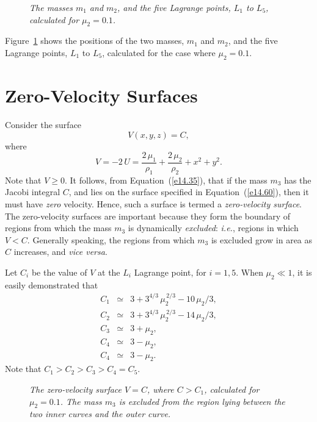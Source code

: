 \begin{figure}
\epsfysize=2.75in
\centerline{}
\caption{\em The masses $m_1$ and $m_2$, and the five Lagrange points, $L_1$ to $L_5$, calculated
for $\mu_2=0.1$.}\label{flag}
\end{figure}

Figure~\ref{flag} shows the positions of the two masses, $m_1$ and $m_2$, and
the five Lagrange points, $L_1$ to $L_5$, calculated for the case where $\mu_2=0.1$.

\section{Zero-Velocity Surfaces}
Consider the surface
\begin{equation}\label{e14.60}
V(x,y,z) = C,
\end{equation}
where
\begin{equation}
V = - 2\,U = \frac{2\,\mu_1}{\rho_1} 
+ \frac{2\,\mu_2}{\rho_2} +x^2+y^2.
\end{equation}
Note that $V\geq 0$.
It follows, from Equation~(\ref{e14.35}), that if the mass $m_3$ has the Jacobi
integral $C$, and lies on the surface specified in Equation~(\ref{e14.60}),
then it must have {\em zero}\/ velocity. Hence, such a surface is termed a
{\em zero-velocity surface}. The zero-velocity surfaces are important
because they form the boundary of regions from which
the mass $m_3$ is dynamically {\em excluded}: {\em i.e.}, regions in which $V< C$. 
Generally speaking, the regions from which $m_3$ is excluded grow in area as
$C$ increases, and {\em vice versa}.

Let  $C_i$ be the value of $V$ at the $L_i$ Lagrange point, for $i=1,5$. When $\mu_2\ll 1$,
it is easily demonstrated that
\begin{eqnarray}
C_1&\simeq & 3 + 3^{4/3}\,\mu_2^{\,2/3}-10\,\mu_2/3,\\[0.5ex]
C_2&\simeq & 3 + 3^{4/3}\,\mu_2^{\,2/3}-14\,\mu_2/3,\\[0.5ex]
C_3&\simeq & 3 + \mu_2,\\[0.5ex]
C_4&\simeq & 3 - \mu_2,\\[0.5ex]
C_4&\simeq & 3 - \mu_2.
\end{eqnarray}
Note that $C_1>C_2>C_3>C_4=C_5$.

\begin{figure}
\centerline{}
\caption{\em The zero-velocity surface $V=C$, where $C> C_1$, calculated for $\mu_2=0.1$. The mass $m_3$ is excluded
from the region lying between the two inner curves and the outer curve.}\label{fz1}
\end{figure}

